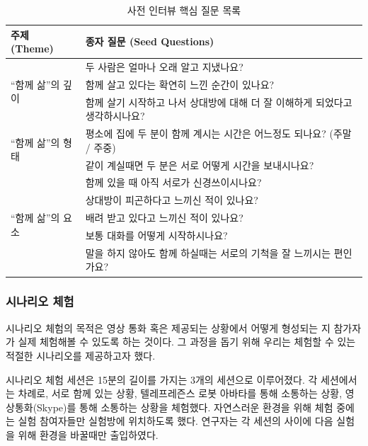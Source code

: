 \begin{table}
	\centering
	\caption{사전 인터뷰 핵심 질문 목록}
	\label{tab:userstudy_pre_questionnaire}
	\newcommand{\mr}[2]{\multirow{#1}{*}{#2}}
	\begin{tabular}{ll}
		\toprule
		\textbf{주제 (Theme)} & \textbf{종자 질문 (Seed Questions)} \\
		\midrule
		\mr{3}{``함께 삶''의 깊이}
		& 두 사람은 얼마나 오래 알고 지냈나요? \\
		& 함께 살고 있다는 확연히 느낀 순간이 있나요? \\
		& 함께 살기 시작하고 나서 상대방에 대해 더 잘 이해하게 되었다고 생각하시나요? \\
		\midrule
		\mr{2}{``함께 삶''의 형태}
		& 평소에 집에 두 분이 함께 계시는 시간은 어느정도 되나요? (주말 / 주중) \\
		& 같이 계실때면 두 분은 서로 어떻게 시간을 보내시나요? \\
		\midrule
		\mr{5}{``함께 삶''의 요소}
		& 함께 있을 때 아직 서로가 신경쓰이시나요? \\
		& 상대방이 피곤하다고 느끼신 적이 있나요? \\
		& 배려 받고 있다고 느끼신 적이 있나요? \\
		& 보통 대화를 어떻게 시작하시나요? \\
		& 말을 하지 않아도 함께 하실때는 서로의 기척을 잘 느끼시는 편인가요? \\
		\bottomrule
	\end{tabular}
\end{table}


\subsubsection{시나리오 체험}

시나리오 체험의 목적은 영상 통화 혹은 \sysname\이 제공되는 상황에서 \concept\가 어떻게 형성되는 지 참가자가 실제 체험해볼 수 있도록 하는 것이다. 그 과정을 돕기 위해 우리는 \concept\를 체험할 수 있는 적절한 시나리오를 제공하고자 했다.

시나리오 체험 세션은 15분의 길이를 가지는 3개의 세션으로 이루어졌다. 각 세션에서는 차례로, 서로 함께 있는 상황, 텔레프레즌스 로봇 아바타를 통해 소통하는 상황, 영상통화(Skype)를 통해 소통하는 상황을 체험했다. 자연스러운 환경을 위해 체험 중에는 실험 참여자들만 실험방에 위치하도록 했다. 연구자는 각 세션의 사이에 다음 실험을 위해 환경을 바꿀때만 출입하였다.

